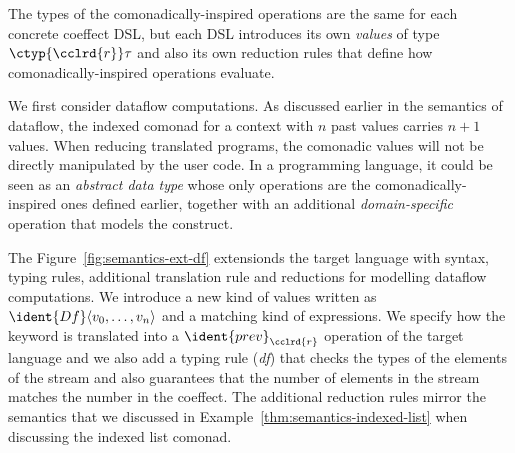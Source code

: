 The types of the comonadically-inspired operations are the same for each concrete coeffect DSL, but
each DSL introduces its own \emph{values} of type $\ctyp{\cclrd{r}}\tau$ and also its own reduction
rules that define how comonadically-inspired operations evaluate.

We first consider dataflow computations. As discussed earlier in the
semantics of dataflow, the indexed comonad for a context with $n$ past values carries $n+1$
values. When reducing translated programs, the comonadic values will not be directly manipulated by the
user code. In a programming language, it could be seen as an \emph{abstract data type} whose only
operations are the comonadically-inspired ones defined earlier, together with an additional
\emph{domain-specific} operation that models the  construct.

The Figure~\ref{fig:semantics-ext-df} extensionds the target language with syntax, typing rules,
additional translation rule and reductions for modelling dataflow computations. We introduce a
new kind of values written as $\ident{Df}\langle v_0, \ldots, v_n\rangle$
and a matching kind of expressions. We specify how the  keyword is translated into a
$\ident{prev}_\cclrd{r}$ operation of the target language and we also add a typing rule
(\emph{df}) that checks the types of the elements of the stream and also guarantees
that the number of elements in the stream matches the number in the coeffect.
The additional reduction rules mirror the semantics that we discussed in
Example~\ref{thm:semantics-indexed-list} when discussing the indexed list comonad.


